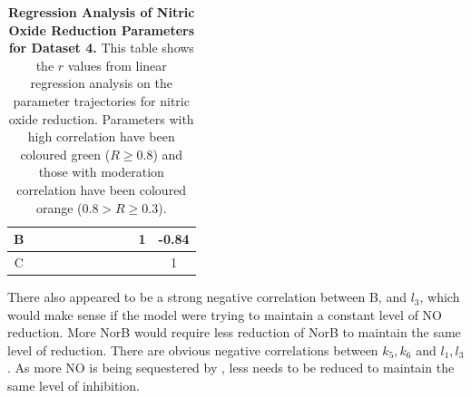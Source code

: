 \begin{table}[p]
{\begin{minipage}{24.4cm}
\begin{tabular}{|c|c|c|c|c|c|c|c|c|c|c|}
    \hline
    \cellcolor{dark-gray}B & \cellcolor{light-gray} & \cellcolor{light-gray} & \cellcolor{light-gray} & \cellcolor{light-gray} & \cellcolor{light-gray} & \cellcolor{light-gray} & \cellcolor{light-gray} & \cellcolor{light-gray} & \cellcolor{light-gray}1 & \cellcolor{green}-0.84 \\
    \hline
    \cellcolor{dark-gray}C & \cellcolor{light-gray} & \cellcolor{light-gray} & \cellcolor{light-gray} & \cellcolor{light-gray} & \cellcolor{light-gray} & \cellcolor{light-gray} & \cellcolor{light-gray} & \cellcolor{light-gray} & \cellcolor{light-gray} & \cellcolor{light-gray}1 \\
    \hline
  \end{tabular}
  \caption[Regression Analysis of Nitric Oxide Reduction Parameters]{{\bf Regression Analysis of Nitric Oxide Reduction Parameters for Dataset 4.} This table shows the $r$ values from linear regression analysis on the parameter trajectories for nitric oxide reduction. Parameters with high correlation have been coloured green ($R\geq0.8$) and those with moderation correlation have been coloured orange ($0.8>R\geq0.3$).
  \label{tab:noregress4}}
  \end{minipage}
  }
\end{table}
\afterpage{\clearpage}
There also appeared to be a strong negative correlation between B, and $l_3$, which would make sense if the model were trying to maintain a constant level of NO reduction. More NorB would require less reduction of NorB to maintain the same level of reduction. There are obvious negative correlations between $k_5,k_6$ and $l_1,l_3$. As more NO is being sequestered by \cbbthree{}, less needs to be reduced to maintain the same level of inhibition.


